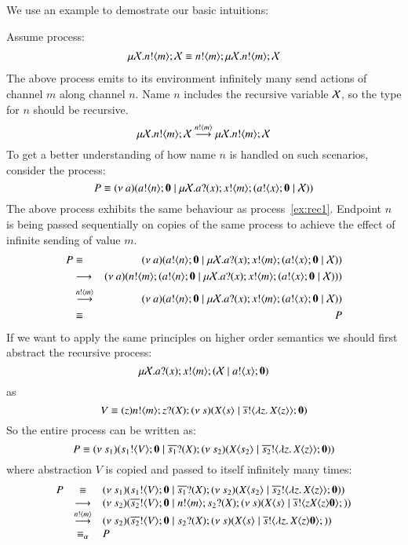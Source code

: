 We use an example to demostrate our basic intuitions:
%
\begin{example}
	Assume process:
%
	\begin{eqnarray}
		\label{ex:rec1}
		\mu \mathcal{X}. n ! \langle m \rangle ; \mathcal{X} \equiv n ! \langle m \rangle ; \mu \mathcal{X}. n ! \langle m \rangle ; \mathcal{X} 
	\end{eqnarray}
%
	\noi The above process emits to its environment infinitely many send actions of channel $m$ along channel $n$.
	Name $n$ includes the recursive
	variable $\mathcal{X}$, so the type for $n$ should be recursive.
%
	\[
		\mu \mathcal{X}. n ! \langle m \rangle ; \mathcal{X} \stackrel{n ! \langle m \rangle}{\longrightarrow} \mu \mathcal{X}. n ! \langle m \rangle ; \mathcal{X}
	\]
%
	To get a better understanding of how name $n$ is handled
	on such scenarios, consider the process:
	\[
		P \equiv (\nu\ a)(a ! \langle n \rangle ; \mathbf{0} \;|\; \mu \mathcal{X}. a ? (x) ; x ! \langle m \rangle ; (a ! \langle x \rangle ; \mathbf{0} \;|\; \mathcal{X}))
	\]
%
	\noi The above process exhibits the same behaviour as
	process~\ref{ex:rec1}.
	Endpoint $n$ is being passed sequentially on copies of the 
	same process to achieve the effect of infinite sending of value $m$.
%
	\begin{eqnarray*}
		P	&\equiv&	(\nu\ a)(a ! \langle n \rangle ; \mathbf{0} \;|\; \mu \mathcal{X}. a ? (x) ; x ! \langle m \rangle ; (a ! \langle x \rangle ; \mathbf{0} \;|\; \mathcal{X}))\\
			&\longrightarrow&		(\nu\ a)(n ! \langle m \rangle ; (a ! \langle n \rangle ; \mathbf{0} \;|\; \mu \mathcal{X}. a ? (x) ; x ! \langle m \rangle ; (a ! \langle x \rangle ; \mathbf{0} \;|\; \mathcal{X})))\\
			&\stackrel{n ! \langle m \rangle}{\longrightarrow}& (\nu\ a)(a ! \langle n \rangle ; \mathbf{0} \;|\; \mu \mathcal{X}. a ? (x) ; x ! \langle m \rangle ; (a ! \langle x \rangle ; \mathbf{0} \;|\; \mathcal{X}))\\
			&\equiv&	P
	\end{eqnarray*}
%
	\noi If we want to apply the same principles on higher order semantics we should first
	abstract the recursive process:
%
	\[
		\mu \mathcal{X}. a ? (x) ; x ! \langle m \rangle ; ( \mathcal{X} \;|\; a ! \langle x \rangle ; \mathbf{0})
	\]
%
	\noi as
%
	\[
		V \equiv (z) n ! \langle m \rangle ; z ? (X) ; (\nu\ s)(X\langle s \rangle \;|\; \overline{s} ! \langle \lambda z.\,X\langle z \rangle \rangle ; \mathbf{0})
	\]
%
	So the entire process can be written as:
	\[
		P \equiv (\nu\ s_1)(s_1 ! \langle V \rangle ; \mathbf{0} \;|\; \overline{s_1} ? (X) ; (\nu\ s_2)(X\langle s_2 \rangle \;|\; \overline{s_2} ! \langle \lambda z.\,X\langle z \rangle \rangle ; \mathbf{0}))	
	\]
%
	\noi where abstraction $V$ is copied and passed to itself
	infinitely many times:
	\[
		\begin{array}{rcl}
			P &\equiv& (\nu\ s_1)(s_1 ! \langle V \rangle ; \mathbf{0} \;|\; \overline{s_1} ? (X) ; (\nu\ s_2)(X\langle s_2 \rangle \;|\; \overline{s_2} ! \langle \lambda z.\,X\langle z \rangle \rangle ; \mathbf{0})) \\
			&\longrightarrow&
			(\nu\ s_2)(\overline{s_2} ! \langle V \rangle ; \mathbf{0} \;|\; n ! \langle m \rangle ; s_2 ? (X) ; (\nu\ s)(X\langle s \rangle \;|\; \overline{s} ! \langle {z}{X\langle z \rangle} \mathbf{0} \rangle ;))\\
			&\stackrel{n ! \langle m \rangle}{\longrightarrow}&
			(\nu\ s_2)(\overline{s_2} ! \langle V \rangle ; \mathbf{0} \;|\; s_2 ? (X) ; (\nu\ s)(X\langle s \rangle \;|\; \overline{s} ! \langle \lambda z.\,X\langle z \rangle \mathbf{0} \rangle ;))\\
			&\equiv_\alpha&
			P
		\end{array}
	\]
%


\end{example}
